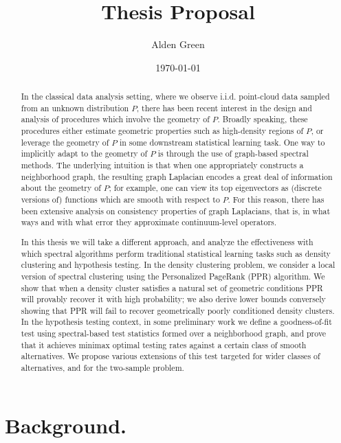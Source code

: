 \documentclass{article}
\newcommand{\1}{\mathbf{1}}
\theoremstyle{alden}
\theoremstyle{aldenthm}
\theoremstyle{definition}
\theoremstyle{remark}
\begin{document}
\title{Thesis Proposal}
\author{Alden Green}
\date{\today}
\maketitle

\begin{abstract}
	In the classical data analysis setting, where we observe i.i.d. point-cloud data sampled from an unknown distribution $P$, there has been recent interest in the design and analysis of procedures which involve the geometry of $P$. Broadly speaking, these procedures either estimate geometric properties such as high-density regions of $P$, or leverage the geometry of $P$ in some downstream statistical learning task. One way to implicitly adapt to the geometry of $P$ is through the use of graph-based spectral methods. The underlying intuition is that when one appropriately constructs a neighborhood graph, the resulting graph Laplacian encodes a great deal of information about the geometry of $P$; for example, one can view its top eigenvectors as (discrete versions of) functions which are smooth with respect to $P$. For this reason, there has been extensive analysis on consistency properties of graph Laplacians, that is, in what ways and with what error they approximate continuum-level operators.
	
	\vspace{.02 in}
	
	In this thesis we will take a different approach, and analyze the effectiveness with which spectral algorithms perform traditional statistical learning tasks such as density clustering and hypothesis testing. In the density clustering problem, we consider a local version of spectral clustering using the Personalized PageRank (PPR) algorithm. We show that when a density cluster satisfies a natural set of geometric conditions PPR will provably recover it with high probability; we also derive lower bounds conversely showing that PPR will fail to recover geometrically poorly conditioned density clusters. In the hypothesis testing context, in some preliminary work we define a goodness-of-fit test using spectral-based test statistics formed over a neighborhood graph, and prove that it achieves minimax optimal testing rates against a certain class of smooth alternatives. We propose various extensions of this test targeted for wider classes of alternatives, and for the two-sample problem.
\end{abstract}


\section{Background.}
\end{document}
